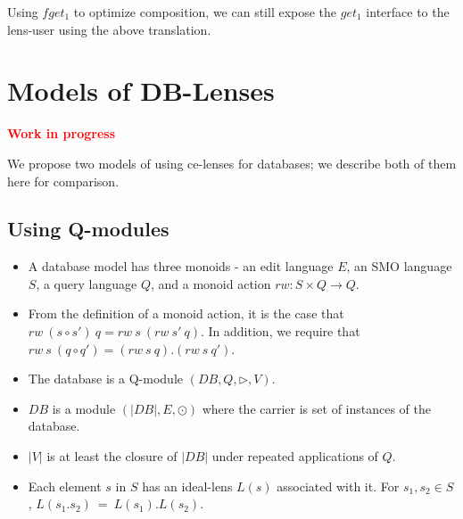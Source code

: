 \documentclass[a4paper,10pt]{article}
\newcommand{\finish}[1]{#1}
\newcommand{\comment}[1]{\finish{\textbf{\textcolor{red}{#1}}}}
\begin{document}
  Using $fget_1$ to optimize composition, we can still expose the $get_1$ interface to the lens-user using the above translation.
  
\section{Models of DB-Lenses}
\comment{Work in progress}

  We propose two models of using ce-lenses for databases; we describe both of them here for comparison.
  
\subsection{Using Q-modules}
\begin{itemize}
\item A database model has three monoids - an edit language $E$, an SMO language $S$, a query language $Q$, and a monoid action $rw : S \times Q \to Q$.
 
\item From the definition of a monoid action, it is the case that $rw~(s \circ s')~q = rw~s~(rw~s'~q)$. In addition, we require that $rw~s~(q \circ q') = (rw~s~q). (rw~s~q')$.
\item The database is a Q-module $(DB,Q,\rhd,V)$.
\item $DB$ is a module $(|DB|,E,\odot)$ where the carrier is set of instances of the database.
\item $|V|$ is at least the closure of $|DB|$ under repeated applications of $Q$.
\item Each element $s$ in $S$ has an ideal-lens $L(s)$ associated with it. For $s_1,s_2 \in S$, $L(s_1 . s_2) ~=~ L(s_1) . L(s_2)$.
\end{itemize}
\end{document}
